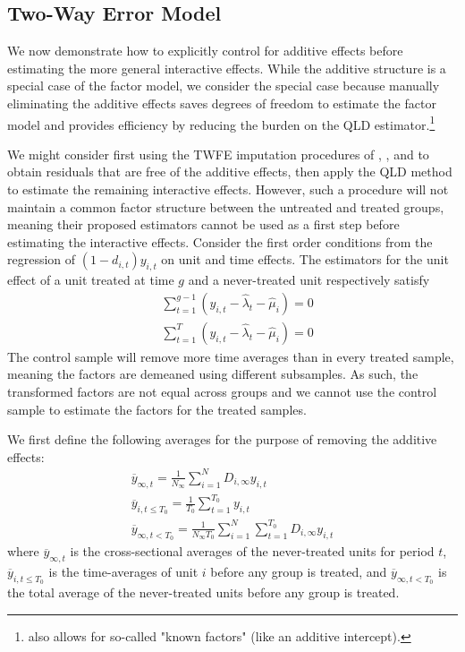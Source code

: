 \documentclass[12pt]{article}
\begin{document}
\subsection{Two-Way Error Model}

We now demonstrate how to explicitly control for additive effects before estimating the more general interactive effects. While the additive structure is a special case of the factor model, we consider the special case because manually eliminating the additive effects saves degrees of freedom to estimate the factor model and provides efficiency by reducing the burden on the QLD estimator.\footnote{\citet{pesaran2006estimation} also allows for so-called "known factors" (like an additive intercept).} 

We might consider first using the TWFE imputation procedures of \citet{Gardner_2021}, \cite{Wooldridge_2021}, and \citet{Borusyak_Jaravel_Spiess_2021} to obtain residuals that are free of the additive effects, then apply the QLD method to estimate the remaining interactive effects. However, such a procedure will not maintain a common factor structure between the untreated and treated groups, meaning their proposed estimators cannot be used as a first step before estimating the interactive effects. Consider the first order conditions from the regression of $(1 - d_{i,t})y_{i,t}$ on unit and time effects. The estimators for the unit effect of a unit treated at time $g$ and a never-treated unit respectively satisfy
\begin{align}
  &\sum_{t = 1}^{g-1} (y_{i,t} - \widehat{\lambda}_t - \widehat{\mu}_i) = 0\\
  &\sum_{t = 1}^T (y_{i,t} - \widehat{\lambda}_t - \widehat{\mu}_i) = 0
\end{align}
The control sample will remove more time averages than in every treated sample, meaning the factors are demeaned using different subsamples. As such, the transformed factors are not equal across groups and we cannot use the control sample to estimate the factors for the treated samples. 

We first define the following averages for the purpose of removing the additive effects:
\begin{gather}
  \overline{y}_{\infty , t} = \frac{1}{N_{\infty}} \sum_{i = 1}^N D_{i, \infty} y_{i,t} \\
  \overline{y}_{i,t\leq T_0} = \frac{1}{T_0} \sum_{t = 1}^{T_0} y_{i,t} \\
  \overline{y}_{\infty, t < T_0} = \frac{1}{N_{\infty} T_0} \sum_{i = 1}^N \sum_{t = 1}^{T_0} D_{i, \infty} y_{i,t}
\end{gather}
where $\overline{y}_{\infty , t}$ is the cross-sectional averages of the never-treated units for period $t$, $\overline{y}_{i,t\leq T_0}$ is the time-averages of unit $i$ before any group is treated, and $\overline{y}_{\infty, t < T_0}$ is the total average of the never-treated units before any group is treated.
\end{document}
